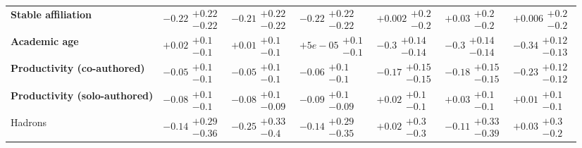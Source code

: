 \begin{table}[H]
\begin{tabular}{lllllll}
\textbf{Stable affiliation} & $-0.22\substack{+0.22 \\ -0.22}$ & $-0.21\substack{+0.22 \\ -0.22}$ & $-0.22\substack{+0.22 \\ -0.22}$ & $+0.002\substack{+0.2 \\ -0.2}$ & $+0.03\substack{+0.2 \\ -0.2}$ & $+0.006\substack{+0.2 \\ -0.2}$ \\
\textbf{Academic age} & $+0.02\substack{+0.1 \\ -0.1}$ & $+0.01\substack{+0.1 \\ -0.1}$ & $+5e-05\substack{+0.1 \\ -0.1}$ & $\bm{-0.3}\substack{+0.14 \\ -0.14}$ & $\bm{-0.3}\substack{+0.14 \\ -0.14}$ & $\bm{-0.34}\substack{+0.12 \\ -0.13}$ \\
\textbf{Productivity (co-authored)} & $-0.05\substack{+0.1 \\ -0.1}$ & $-0.05\substack{+0.1 \\ -0.1}$ & $-0.06\substack{+0.1 \\ -0.1}$ & $\bm{-0.17}\substack{+0.15 \\ -0.15}$ & $\bm{-0.18}\substack{+0.15 \\ -0.15}$ & $\bm{-0.23}\substack{+0.12 \\ -0.12}$ \\
\textbf{Productivity (solo-authored)} & $-0.08\substack{+0.1 \\ -0.1}$ & $-0.08\substack{+0.1 \\ -0.09}$ & $-0.09\substack{+0.1 \\ -0.09}$ & $+0.02\substack{+0.1 \\ -0.1}$ & $+0.03\substack{+0.1 \\ -0.1}$ & $+0.01\substack{+0.1 \\ -0.1}$ \\
\hline Hadrons & $-0.14\substack{+0.29 \\ -0.36}$ & $-0.25\substack{+0.33 \\ -0.4}$ & $-0.14\substack{+0.29 \\ -0.35}$ & $+0.02\substack{+0.3 \\ -0.3}$ & $-0.11\substack{+0.33 \\ -0.39}$ & $+0.03\substack{+0.3 \\ -0.2}$ \\

\end{tabular}
\end{table}
